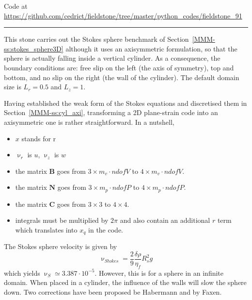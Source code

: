 

\begin{center}
Code at \url{https://github.com/cedrict/fieldstone/tree/master/python_codes/fieldstone_91}
\end{center}

\par\noindent\rule{\textwidth}{0.4pt}



This stone carries out the Stokes sphere benchmark of Section~\ref{MMM-ss:stokes_sphere3D} although 
it uses an axisymmetric formulation, so that the sphere is actually falling inside 
a vertical cylinder. As a consequence, the boundary conditions are: 
free slip on the left (the axis of symmetry), top and bottom, and no slip on the right (the
wall of the cylinder). The default domain size is $L_r=0.5$ and $L_z=1$.

Having established the weak form of the Stokes equations and discretised them in 
Section~\ref{MMM-ss:cyl_axi}, transforming a 2D plane-strain code into an axisymmetric 
one is rather straightforward. In a nutshell, 
\begin{itemize}
\item $x$ stands for r
\item $\upnu_r$ is $u$, $\upnu_z$ is $w$
\item the matrix ${\bm B}$ goes from 
$3 \times m_v\cdot ndofV$ to $4 \times m_v\cdot ndofV$. 
\item the matrix ${\bm N}$ goes from $3 \times m_p\cdot ndofP$ to $4 \times m_p\cdot ndofP$. 
\item the matrix ${\bm C}$ goes from $3 \times 3$ to $4 \times 4$.
\item integrals must be multiplied by $2 \pi$ and also contain an additional $r$ term
which translates into $x_q$ in the code. 
\end{itemize}

The Stokes sphere velocity is given by
\[
\upnu_{Stokes} = \frac{2}{9} \frac{\delta \rho}{\eta_f} R_s^2 g
\]
which yields $\upnu_S\simeq 3.387 \cdot 10^{-5}$. However, 
this is for a sphere in an infinite domain. When placed in a 
cylinder, the influence of the walls will slow the sphere down. 
Two corrections have been proposed be Habermann and by Faxen.

